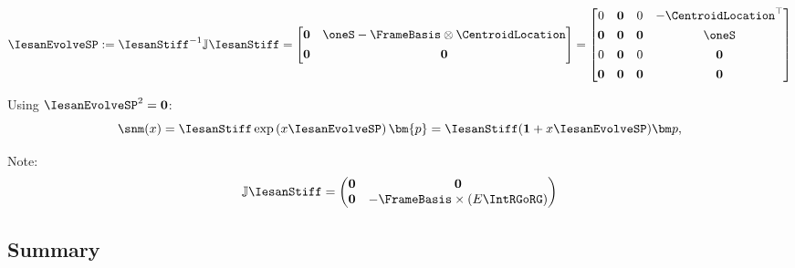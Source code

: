 \begin{equation}
\IesanEvolveSP
:=\IesanStiff^{-1}\mathbb{J}\IesanStiff 
=\begin{bmatrix}
\mathbf{0} & \oneS - \FrameBasis\otimes\CentroidLocation \\[4pt]
\mathbf{0} & \mathbf{0}
\end{bmatrix}
= \begin{bmatrix}
0 & \mathbf{0} & 0 & -\CentroidLocation^{\top} \\[4pt]
\mathbf{0} & \mathbf{0} & \mathbf{0} & \oneS \\[4pt]
0 & \mathbf{0} & 0 & \mathbf{0} \\[4pt]
\mathbf{0} & \mathbf{0} & \mathbf{0} & \mathbf{0} \\
\end{bmatrix}
\label{eq:A-matrix-neg}
\end{equation}

\begin{Details}
Using $\IesanEvolveSP^2=\mathbf 0$:
\begin{equation*}
\snm(x)=\IesanStiff\exp\left(x\IesanEvolveSP\right)\bm{p} 
=\IesanStiff(\mathbf 1+x\IesanEvolveSP)\bm p,
\end{equation*}
\end{Details}
\begin{Details}
Note:
\begin{equation*}
\mathbb{J}\IesanStiff = 
\begin{pmatrix}
    \mathbf{0} & \mathbf{0} \\
    \mathbf{0} & -\FrameBasis\times(E\IntRGoRG)
\end{pmatrix}
\end{equation*}
\end{Details}


\subsection{Summary}

